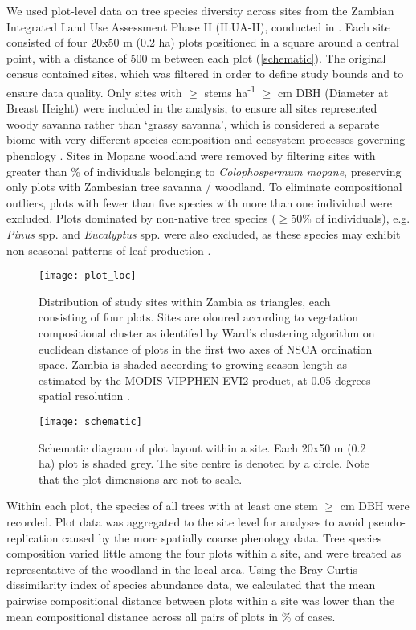 \documentclass[11pt,a4paper]{article}
\begin{document}
We used plot-level data on tree species diversity across \nSites{} sites from the Zambian Integrated Land Use Assessment Phase II (ILUA-II), conducted in \censusDate{} \citep{Mukosha2009, Pelletier2018}. Each site consisted of four 20x50 m (0.2 ha) plots positioned in a square around a central point, with a distance of 500 m between each plot (\autoref{schematic}). The original census contained \nTotalSites{} sites, which was filtered in order to define study bounds and to ensure data quality. Only sites with $\geq$\stemsHa{} stems ha\textsuperscript{-1} $\geq$\stemSize{} cm DBH (Diameter at Breast Height) were included in the analysis, to ensure all sites represented woody savanna rather than `grassy savanna', which is considered a separate biome with very different species composition and ecosystem processes governing phenology \citep{Parr2014}. Sites in Mopane woodland were removed by filtering sites with greater than \mopanePer{}\% of individuals belonging to \textit{Colophospermum mopane}, preserving only plots with Zambesian tree savanna / woodland. To eliminate compositional outliers, plots with fewer than five species with more than one individual were excluded. Plots dominated by  non-native tree species ($\geq$50\% of individuals), e.g. \textit{Pinus} spp. and \textit{Eucalyptus} spp. were also excluded, as these species may exhibit non-seasonal patterns of leaf production \citep{}.

\begin{figure}[H]
\centering
	\texttt{[image: plot\_loc]}
	\caption{Distribution of study sites within Zambia as triangles, each consisting of four plots. Sites are oloured according to vegetation compositional cluster as identifed by Ward's clustering algorithm on euclidean distance of plots in the first two axes of NSCA ordination space. Zambia is shaded according to growing season length as estimated by the MODIS VIPPHEN-EVI2 product, at 0.05 degrees spatial resolution \citep{VIPPHEN}.}
	\label{plot_loc}
\end{figure}

\begin{figure}[H]
\centering
	\texttt{[image: schematic]}
	\caption{Schematic diagram of plot layout within a site. Each 20x50 m (0.2 ha) plot is shaded grey. The site centre is denoted by a circle. Note that the plot dimensions are not to scale.}
	\label{schematic}
\end{figure}

Within each plot, the species of all trees with at least one stem $\geq$\stemSize{} cm DBH were recorded. Plot data was aggregated to the site level for analyses to avoid pseudo-replication caused by the more spatially coarse phenology data. Tree species composition varied little among the four plots within a site, and were treated as representative of the woodland in the local area. Using the Bray-Curtis dissimilarity index of species abundance data, we calculated that the mean pairwise compositional distance between plots within a site was lower than the mean compositional distance across all pairs of plots in \plotDistPer{}\% of cases. 
\end{document}
